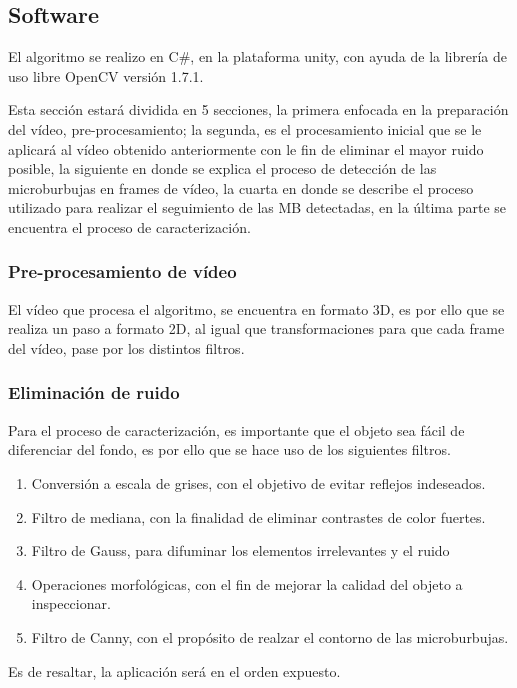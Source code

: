 \documentclass[12pt,twocolumn,a4paper]{article}
\begin{document}
\subsection{Software}
El algoritmo se realizo en C\#, en la plataforma unity, con ayuda de la librería de uso libre OpenCV versión 1.7.1.

Esta sección estará dividida en 5 secciones, la primera enfocada en la preparación del vídeo, pre-procesamiento;  la segunda, es  el procesamiento inicial que se le aplicará al vídeo obtenido anteriormente con le fin de eliminar el mayor ruido posible, la siguiente en donde se explica el proceso de detección de las microburbujas en frames de vídeo, la cuarta  en donde se describe el proceso utilizado para realizar el seguimiento de las MB detectadas, en la última parte se encuentra el proceso de caracterización.

\subsubsection{Pre-procesamiento de vídeo}

El vídeo que procesa el algoritmo, se encuentra en formato 3D, es por ello que se realiza un paso a formato 2D, al igual que transformaciones para que cada frame del vídeo, pase por los distintos filtros. 

\subsubsection{Eliminación de ruido}
Para el proceso de caracterización, es importante que el objeto sea fácil de diferenciar del fondo, es por ello que se hace uso de los siguientes filtros.

\begin{enumerate}
\item Conversión a escala de grises, con el objetivo de evitar reflejos indeseados. 
\item Filtro de mediana, con la finalidad de eliminar contrastes de color fuertes.
\item Filtro de Gauss, para difuminar los elementos irrelevantes y el ruido
\item Operaciones morfológicas, con el fin de mejorar la calidad del objeto a inspeccionar.
\item Filtro de Canny, con el propósito de realzar el contorno de las microburbujas.
\end{enumerate}

Es de resaltar, la aplicación será en el orden expuesto. 
\end{document}
